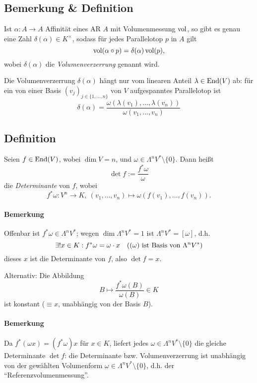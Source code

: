 \subsection{Bemerkung \& Definition}
	\begin{Definition}[Volumenverzerrung]
		Ist $ \alpha: A\to A $ Affinität eines AR $ A $ mit Volumenmessung $ \operatorname{vol} $, so gibt es genau eine Zahl $ \delta(\alpha)\in K^{\times} $, sodass für jedes Parallelotop $ p $ in $ A $ gilt
			\[ \operatorname{vol}(\alpha\circ p) = \delta(\alpha)\operatorname{vol}(p), \]
		wobei $ \delta(\alpha) $ die \emph{Volumenverzerrung} genannt wird.
		
		Die Volumenverzerrung $ \delta(\alpha) $ hängt nur vom linearen Anteil $ \lambda\in \operatorname{End}(V) $ ab: für ein von einer Basis $ (v_j)_{j\in \{1,\dots,n\}} $ von $ V $ aufgespanntes Parallelotop ist
			\[ \delta(\alpha) = \frac{\omega(\lambda(v_1),\dots,\lambda(v_n))}{\omega(v_1,\dots,v_n)} \]
	\end{Definition}
\subsection{Definition}
	\begin{Definition}
		Seien $ f\in\operatorname{End}(V) $, wobei $ \dim V=n $, und $ \omega\in \Lambda^nV^*\setminus \{0\} $. Dann heißt
		\[ \det f:= \frac{f^*\omega}{\omega} \]
	die \emph{Determinante} von $ f $, wobei
		\[ f^*\omega: V^n\to K,\ (v_1,\dots,v_n)\mapsto \omega(f(v_1),\dots,f(v_n)). \]
	\end{Definition}
\paragraph{Bemerkung}
	Offenbar ist $ f^*\omega\in \Lambda^nV^*$; wegen $ \dim \Lambda^nV^*=1 $ ist $\Lambda^nV^* = [\omega]$, d.h.
		\[ \exists! x\in K: f^*\omega = \omega \cdot x \quad\text{($(\omega) $ ist Basis von $ \Lambda^nV^* $)} \]
	dieses $ x $ ist die Determinante von $ f $, also $ \det f = x $.
	
	Alternativ: Die Abbildung
		\[ B\mapsto  \frac{f^*\omega(B)}{\omega(B)}\in K\]
	ist konstant ($ \equiv x $, unabhängig von der Basis $ B $).
\paragraph{Bemerkung}
	Da $ f^*(\omega x) = (f^*\omega)x $ für $ x\in K $, liefert jedes $ \omega \in \Lambda^nV^*\setminus\{0\} $ die gleiche Determinante $ \det f $: die Determinante bzw. Volumenverzerrung ist unabhängig von der gewählten Volumenform $ \omega\in \Lambda^nV^*\setminus \{0\} $, d.h. der "`Referenzvolumenmessung"'.
